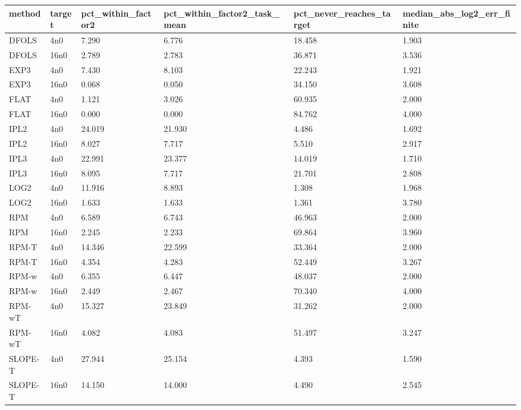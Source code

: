 \begin{tabular}{llllll}
\hline
method & target & pct\_within\_factor2 & pct\_within\_factor2\_task\_mean & pct\_never\_reaches\_target & median\_abs\_log2\_err\_finite \\
\hline
DFOLS & 4n0 & 7.290 & 6.776 & 18.458 & 1.903 \\
DFOLS & 16n0 & 2.789 & 2.783 & 36.871 & 3.536 \\
EXP3 & 4n0 & 7.430 & 8.103 & 22.243 & 1.921 \\
EXP3 & 16n0 & 0.068 & 0.050 & 34.150 & 3.608 \\
FLAT & 4n0 & 1.121 & 3.026 & 60.935 & 2.000 \\
FLAT & 16n0 & 0.000 & 0.000 & 84.762 & 4.000 \\
IPL2 & 4n0 & 24.019 & 21.930 & 4.486 & 1.692 \\
IPL2 & 16n0 & 8.027 & 7.717 & 5.510 & 2.917 \\
IPL3 & 4n0 & 22.991 & 23.377 & 14.019 & 1.710 \\
IPL3 & 16n0 & 8.095 & 7.717 & 21.701 & 2.808 \\
LOG2 & 4n0 & 11.916 & 8.893 & 1.308 & 1.968 \\
LOG2 & 16n0 & 1.633 & 1.633 & 1.361 & 3.780 \\
RPM & 4n0 & 6.589 & 6.743 & 46.963 & 2.000 \\
RPM & 16n0 & 2.245 & 2.233 & 69.864 & 3.960 \\
RPM-T & 4n0 & 14.346 & 22.599 & 33.364 & 2.000 \\
RPM-T & 16n0 & 4.354 & 4.283 & 52.449 & 3.267 \\
RPM-w & 4n0 & 6.355 & 6.447 & 48.037 & 2.000 \\
RPM-w & 16n0 & 2.449 & 2.467 & 70.340 & 4.000 \\
RPM-wT & 4n0 & 15.327 & 23.849 & 31.262 & 2.000 \\
RPM-wT & 16n0 & 4.082 & 4.083 & 51.497 & 3.247 \\
SLOPE-T & 4n0 & 27.944 & 25.154 & 4.393 & 1.590 \\
SLOPE-T & 16n0 & 14.150 & 14.000 & 4.490 & 2.545 \\
\hline
\end{tabular}
